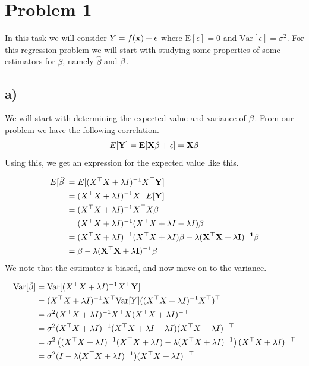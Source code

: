 \documentclass[
]{article}
\begin{document}
\hypertarget{problem-1}{%
\section{Problem 1}\label{problem-1}}

In this task we will consider \(Y = f(\bf{x}) + \epsilon\) where
\(\text{E}[\epsilon] = 0\) and \(\text{Var}[\epsilon] = \sigma^2\). For
this regression problem we will start with studying some properties of
some estimators for \(\beta\), namely \(\hat{\beta}\) and
\({\bf{\beta}}\).

\hypertarget{a}{%
\subsection{a)}\label{a}}

We will start with determining the expected value and variance of
\({\bf{\beta}}\). From our problem we have the following correlation. \[
E[\bf{Y}] = E[X \bf{\beta}+ \bf{\epsilon}] = X\bf{\beta} 
\] Using this, we get an expression for the expected value like this.

\[
\begin{aligned}
E[\tilde{\bf{\beta}}] &= E[(X^\top X+\lambda I)^{-1}X^\top \bf{Y}] \\
&=  (X^\top X+\lambda I)^{-1}X^\top E[\bf{Y}]\\
&=(X^\top X+\lambda I)^{-1}X^\top X \bf{\beta}\\
&= (X^\top X+\lambda I)^{-1} (X^\top X + \lambda I - \lambda I) \bf{\beta}\\
&= (X^\top X+\lambda I)^{-1} (X^\top X + \lambda I) \bf{\beta}- \lambda(X^\top X+\lambda I)^{-1} \beta\\
&= \bf{\beta}- \lambda(X^\top X+\lambda I)^{-1} \beta
\end{aligned}
\] We note that the estimator is biased, and now move on to the
variance.

\[
\begin{aligned}
\text{Var}[\tilde{\beta}]
&= \text{Var}[(X^\top X+\lambda I)^{-1}X^\top \bf{Y}]\\
&= (X^\top X+\lambda I)^{-1}X^\top \text{Var}[Y] ((X^\top X+\lambda I)^{-1}X^\top)^\top\\
&= \sigma^2 (X^\top X+\lambda I)^{-1}X^\top X (X^\top X+\lambda I)^{-\top}\\
&= \sigma^2 (X^\top X+\lambda I)^{-1} (X^\top X + \lambda I-\lambda I ) (X^\top X+\lambda I)^{-\top}\\
&= \sigma^2 \left((X^\top X+\lambda I)^{-1} (X^\top X+\lambda I) - \lambda(X^\top X+\lambda I)^{-1} \right)(X^\top X+\lambda I)^{-\top}\\
&= \sigma^2 (I -  \lambda(X^\top X+\lambda I)^{-1})(X^\top X+\lambda I)^{-\top}\\
\end{aligned}
\]
\end{document}
